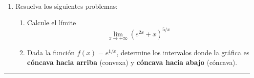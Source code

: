 \documentclass[11pt,letterpaper,hidelinks]{article}
\begin{document}
\begin{enumerate}[label={\bf P.\arabic*}]
    \item Resuelva los siguientes problemas:
    \begin{enumerate}
        \item Calcule el límite
        \[ \lim_{x \to +\infty} (e^{2x} + x)^{5/x} \]
        \item Dada la función $f(x) = e^{1/x}$, determine los intervalos donde la gráfica es \textbf{cóncava hacia arriba} (convexa) y \textbf{cóncava hacia abajo} (cóncava).
    \end{enumerate}
\end{enumerate}
	
\vfill
\hrule 
\vspace{0.2cm}
\end{document}
